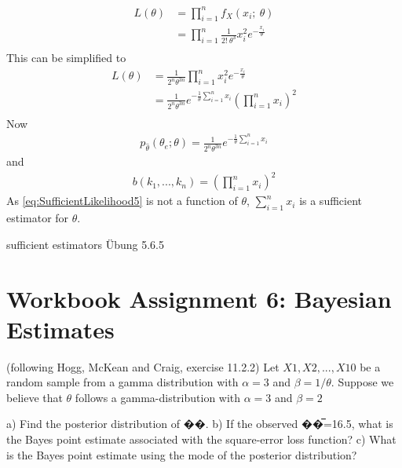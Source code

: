 \begin{equation}
\begin{split}
L(\theta) 
&= \prod_{i=1}^n f_X(x_i;~\theta)\\
&= \prod_{i=1}^n \frac{1}{2!~\theta^3}x_i^2e^{-\frac{x_i}{\theta}}\\
\end{split}
\label{eq:SufficientLikelihood2}
\end{equation}
This can be simplified to 
\begin{equation}
\begin{split}
L(\theta) 
&= \frac{1}{2^n\theta^{3n}}\prod_{i=1}^n x_i^2e^{-\frac{x_i}{\theta}}\\
&= \frac{1}{2^n\theta^{3n}} e^{-\frac{1}{\theta}\sum_{i=1}^nx_i} \left(\prod_{i=1}^n x_i\right)^2\\
\end{split}
\label{eq:SufficientLikelihood3}
\end{equation}
Now
\begin{equation}
\begin{split}
p_{\hat{\theta}}(\theta_e;\theta) = \frac{1}{2^n\theta^{3n}} e^{-\frac{1}{\theta}\sum_{i=1}^nx_i}
\end{split}
\label{eq:SufficientLikelihood4}
\end{equation}
and
\begin{equation}
\begin{split}
b(k_1,...,k_n) = \left(\prod_{i=1}^n x_i\right)^2
\end{split}
\label{eq:SufficientLikelihood5}
\end{equation}
As \eqref{eq:SufficientLikelihood5} is not a function of $\theta$, $\sum_{i=1}^nx_i$ is a sufficient estimator for $\theta$.

sufficient estimators
Übung 5.6.5


\chapter{Workbook Assignment 6: Bayesian Estimates}	

(following Hogg, McKean and Craig, exercise 11.2.2)
Let $X1, X2, ... , X10$ be a random sample from a gamma distribution with $\alpha =3$ and $\beta =1/\theta$. Suppose we believe that $\theta$ follows a gamma-distribution with $\alpha =3$ and $\beta = 2$

a) Find the posterior distribution of ��.
b) If the observed ��̅=16.5, what is the Bayes point estimate associated with the square-error loss function?
c) What is the Bayes point estimate using the mode of the posterior distribution?





